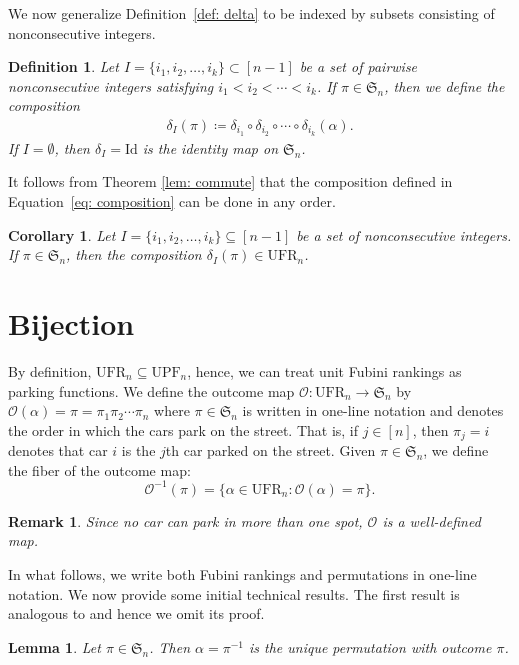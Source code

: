 \documentclass[11pt,reqno]{amsart}
\newcommand{\Out}{\mathcal{O}}
\newcommand{\Sym}{\mathfrak{S}}
\newcommand{\ufr}[1]{\mathrm{UFR}_{#1}}
\newcommand{\upf}[1]{\mathrm{UPF}_{#1}}
\newtheorem{lemma}[rethm]{Lemma}
\newtheorem{corollary}[rethm]{Corollary}
\newtheorem{remark}[rethm]{Remark}
\newtheorem{definition}[rethm]{Definition}
\begin{document}
We now generalize Definition~\ref{def: delta} to be indexed by subsets consisting of nonconsecutive integers.

\begin{definition}
    Let $I=\{i_1,i_2,\ldots,i_k\} \subset [n-1]$ be a set of pairwise nonconsecutive integers satisfying $i_1<i_2<\cdots<i_k$. 
    If $\pi \in \Sym_n$, then we define the composition 
\begin{align}
\label{eq: composition}
\delta_I(\pi)\coloneqq\delta_{i_1}\circ \delta_{i_2}\circ\cdots\circ\delta_{i_k}(\alpha).
\end{align} 
If $I=\emptyset$, then $\delta_I = \mbox{Id}$ is the identity map on $\Sym_n$.
\end{definition}

It follows from Theorem \ref{lem: commute} that the composition defined in Equation~\eqref{eq: composition} can be done in any order.

\begin{corollary}\label{lem:composition}
    Let $I=\{i_1,i_2,\ldots,i_k\}\subseteq[n-1]$ 
be a set of nonconsecutive integers. If $\pi\in \Sym_n$, 
then the composition $    \delta_I(\pi)\in \ufr{n}$.
\end{corollary}


\section{Bijection}
\label{sec: bijection}

By definition,  $\ufr{n}\subseteq \upf{n}$, hence, we can treat unit Fubini rankings as parking functions.
We define the outcome map $\Out: \ufr{n} \rightarrow \Sym_n$ by $\Out(\alpha)=\pi=\pi_1\pi_2\cdots\pi_n$
where $\pi\in\Sym_n$ is written in one-line notation and denotes the order in which the cars park on the street. 
That is, if $j\in[n]$, then $\pi_j=i$ denotes that car $i$ is the $j$th car parked on the street.  
Given $\pi\in \Sym_n$, we define the fiber of the outcome map:
\[\Out^{-1}(\pi)=
\{\alpha\in\ufr{n}: \Out(\alpha)=\pi\}.
\]

\begin{remark}\label{rem:OutWellDef}
    Since no car can park in more than one spot, $\Out$ is a well-defined map.
\end{remark}

In what follows, we write both Fubini rankings and permutations in one-line notation.
We now provide some initial technical results. 
The first result is analogous to \cite[Theorem 2.2]{harris2023outcome} and hence we omit its proof.
\begin{lemma}\label{lem:inverse_perm}
    Let $\pi\in \Sym_n$.
    Then $\alpha = \pi^{-1}$ is the unique permutation with outcome $\pi$.
\end{lemma}
\end{document}
